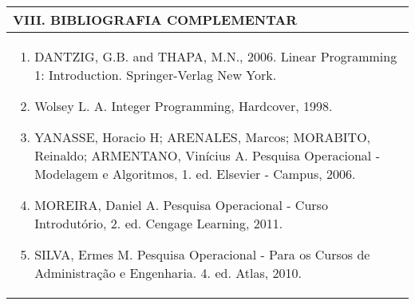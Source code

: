\documentclass[12pt]{article}
\begin{document}

\begin{longtable}{|L{1.025\textwidth}|} \hline
%
{\bf VIII. BIBLIOGRAFIA COMPLEMENTAR} \\ \hline
\begin{enumerate}
\item DANTZIG, G.B. and THAPA, M.N., 2006. Linear Programming 1: Introduction. Springer-Verlag New York.
\item Wolsey L. A. Integer Programming, Hardcover, 1998. 
\item YANASSE, Horacio H; ARENALES, Marcos; MORABITO, Reinaldo; ARMENTANO, Vinícius A. Pesquisa Operacional - Modelagem e Algoritmos, 1. ed. Elsevier - Campus, 2006. 
\item MOREIRA, Daniel A. Pesquisa Operacional - Curso Introdutório, 2. ed. Cengage Learning, 2011. 
\item SILVA, Ermes M. Pesquisa Operacional - Para os Cursos de Administração e Engenharia. 4. ed. Atlas, 2010.



\end{enumerate}
 \\ \hline
\end{longtable}



\end{document}
